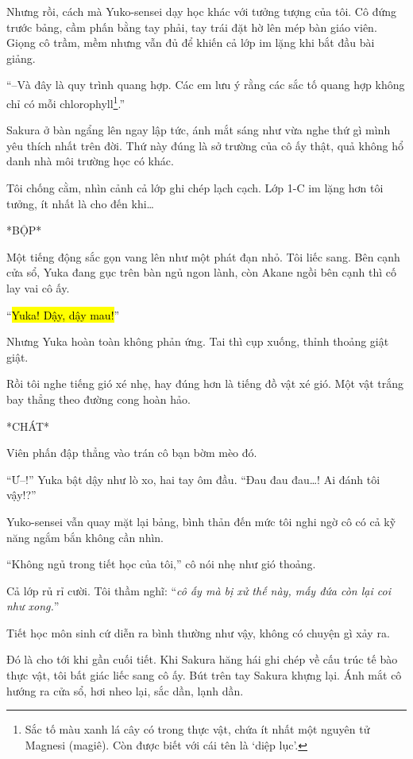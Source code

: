 \documentclass[../main.tex]{subfiles}
\begin{document}
Nhưng rồi, cách mà Yuko-sensei dạy học khác với tưởng tượng của tôi. Cô đứng trước bảng, cầm phấn bằng tay phải, tay trái đặt hờ lên mép bàn giáo viên. Giọng cô trầm, mềm nhưng vẫn đủ để khiến cả lớp im lặng khi bắt đầu bài giảng.

``--Và đây là quy trình quang hợp. Các em lưu ý rằng các sắc tố quang hợp không chỉ có mỗi chlorophyll\footnote{Sắc tố màu xanh lá cây có trong thực vật, chứa ít nhất một nguyên tử Magnesi (magiê). Còn được biết với cái tên là `diệp lục'.}.''

Sakura ở bàn ngẩng lên ngay lập tức, ánh mắt sáng như vừa nghe thứ gì mình yêu thích nhất trên đời. Thứ này đúng là sở trường của cô ấy thật, quả không hổ danh nhà môi trường học có khác.

Tôi chống cằm, nhìn cảnh cả lớp ghi chép lạch cạch. Lớp 1-C im lặng hơn tôi tưởng, ít nhất là cho đến khi\dots

*BỘP*

Một tiếng động sắc gọn vang lên như một phát đạn nhỏ. Tôi liếc sang. Bên cạnh cửa sổ, Yuka đang gục trên bàn ngủ ngon lành, còn Akane ngồi bên cạnh thì cố lay vai cô ấy.

``\hl{Yuka! Dậy, dậy mau!}''

Nhưng Yuka hoàn toàn không phản ứng. Tai thì cụp xuống, thỉnh thoảng giật giật.

Rồi tôi nghe tiếng gió xé nhẹ, hay đúng hơn là tiếng đồ vật xé gió. Một vật trắng bay thẳng theo đường cong hoàn hảo.

*CHÁT*

Viên phấn đập thẳng vào trán cô bạn bờm mèo đó.

``Ư--!'' Yuka bật dậy như lò xo, hai tay ôm đầu. ``Đau đau đau\dots! Ai đánh tôi vậy!?''

Yuko-sensei vẫn quay mặt lại bảng, bình thản đến mức tôi nghi ngờ cô có cả kỹ năng ngắm bắn không cần nhìn.

``Không ngủ trong tiết học của tôi,'' cô nói nhẹ như gió thoảng.

Cả lớp rủ rỉ cười. Tôi thầm nghĩ: ``\textit{cô ấy mà bị xử thế này, mấy đứa còn lại coi như xong.}''

\ct

Tiết học môn sinh cứ diễn ra bình thường như vậy, không có chuyện gì xảy ra.

Đó là cho tới khi gần cuối tiết. Khi Sakura hăng hái ghi chép về cấu trúc tế bào thực vật, tôi bất giác liếc sang cô ấy. Bút trên tay Sakura khựng lại. Ánh mắt cô hướng ra cửa sổ, hơi nheo lại, sắc dần, lạnh dần.
\end{document}
